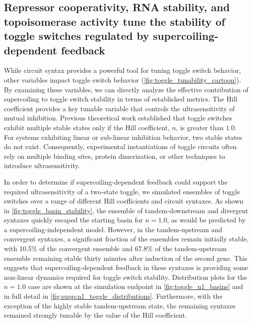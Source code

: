 \documentclass[11pt]{article}
\begin{document}
\subsection{Repressor cooperativity, RNA stability, and topoisomerase activity tune the stability of toggle switches regulated by supercoiling-dependent feedback  }
While circuit syntax provides a powerful tool for tuning toggle switch behavior, other variables impact toggle switch behavior (\cref{fig:toggle_tunability_cartoon}). By examining these variables, we can directly analyze the effective contribution of supercoiling to toggle switch stability in terms of established metrics. The Hill coefficient provides a key tunable variable that controls the ultrasensitivity of mutual inhibition.
 Previous theoretical work established that toggle switches exhibit multiple stable states only if the Hill coefficient, \(n\), is greater than \(1.0\). For systems exhibiting linear or sub-linear inhibition behavior, two stable states do not exist. Consequently, experimental instantiations of toggle circuits often rely on multiple binding sites, protein dimerization, or other techniques to introduce ultrasensitivity.

In order to determine if supercoiling-dependent feedback could support the required ultrasensitivity of a two-state toggle, we simulated ensembles of toggle switches over a range of different Hill coefficients and circuit syntaxes. As shown in \cref{fig:toggle_basin_stability}, the ensemble of tandem-downstream and divergent syntaxes quickly escaped the starting basin for \(n = 1.0\), as would be predicted by a supercoiling-independent model. However, in the tandem-upstream and convergent syntaxes, a significant fraction of the ensembles remain initially stable, with 10.5\% of the convergent ensemble and 67.8\% of the tandem-upstream ensemble remaining stable thirty minutes after induction of the second gene. This suggests that supercoiling-dependent feedback in these syntaxes is providing some non-linear dynamics required for toggle switch stability. Distribution plots for the \(n = 1.0\) case are shown at the simulation endpoint in \cref{fig:toggle_n1_basins} and in full detail in \cref{fig:supp:n1_toggle_distributions}.
Furthermore, with the exception of the highly stable tandem-upstream state, the remaining syntaxes remained strongly tunable by the value of the Hill coefficient.
\end{document}
